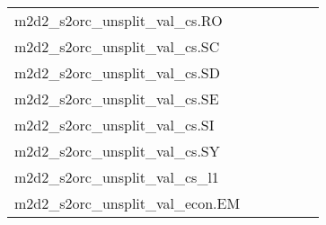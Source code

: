{\begin{longtable}{m{6cm}m{1.7cm}m{1.7cm}m{1.7cm}m{1.7cm}m{1.7cm}}
	m2d2\_s2orc\_unsplit\_val\_cs.RO  & \colorbox[HTML]{bee496}{\makebox[\mywidth][c]{13.04}} & \colorbox[HTML]{e2f3a9}{\makebox[\mywidth][c]{13.19}} & \colorbox[HTML]{ffffe5}{\makebox[\mywidth][c]{14.95}} & \colorbox[HTML]{d3eda0}{\makebox[\mywidth][c]{13.12}} & \colorbox[HTML]{77c578}{\makebox[\mywidth][c]{12.87}}\\
	m2d2\_s2orc\_unsplit\_val\_cs.SC  & \colorbox[HTML]{78c679}{\makebox[\mywidth][c]{11.10}} & \colorbox[HTML]{def2a6}{\makebox[\mywidth][c]{11.42}} & \colorbox[HTML]{ffffe5}{\makebox[\mywidth][c]{13.33}} & \colorbox[HTML]{c3e698}{\makebox[\mywidth][c]{11.30}} & \colorbox[HTML]{77c578}{\makebox[\mywidth][c]{11.10}}\\
	m2d2\_s2orc\_unsplit\_val\_cs.SD  & \colorbox[HTML]{b4e091}{\makebox[\mywidth][c]{13.27}} & \colorbox[HTML]{dcf1a5}{\makebox[\mywidth][c]{13.42}} & \colorbox[HTML]{ffffe5}{\makebox[\mywidth][c]{15.26}} & \colorbox[HTML]{d0ec9e}{\makebox[\mywidth][c]{13.36}} & \colorbox[HTML]{77c578}{\makebox[\mywidth][c]{13.13}}\\
	m2d2\_s2orc\_unsplit\_val\_cs.SE  & \colorbox[HTML]{ffffe5}{\makebox[\mywidth][c]{17.72}} & \colorbox[HTML]{addd8e}{\makebox[\mywidth][c]{13.47}} & \colorbox[HTML]{fefee0}{\makebox[\mywidth][c]{15.46}} & \colorbox[HTML]{a0d789}{\makebox[\mywidth][c]{13.40}} & \colorbox[HTML]{77c578}{\makebox[\mywidth][c]{13.21}}\\
	m2d2\_s2orc\_unsplit\_val\_cs.SI  & \colorbox[HTML]{8ecf81}{\makebox[\mywidth][c]{12.03}} & \colorbox[HTML]{d9f0a3}{\makebox[\mywidth][c]{12.25}} & \colorbox[HTML]{ffffe5}{\makebox[\mywidth][c]{14.03}} & \colorbox[HTML]{c8e89a}{\makebox[\mywidth][c]{12.19}} & \colorbox[HTML]{77c578}{\makebox[\mywidth][c]{11.99}}\\
	m2d2\_s2orc\_unsplit\_val\_cs.SY  & \colorbox[HTML]{7fc97b}{\makebox[\mywidth][c]{11.40}} & \colorbox[HTML]{ebf7b0}{\makebox[\mywidth][c]{11.79}} & \colorbox[HTML]{ffffe5}{\makebox[\mywidth][c]{13.51}} & \colorbox[HTML]{d0ec9e}{\makebox[\mywidth][c]{11.63}} & \colorbox[HTML]{77c578}{\makebox[\mywidth][c]{11.39}}\\
	m2d2\_s2orc\_unsplit\_val\_cs\_l1  & \colorbox[HTML]{77c578}{\makebox[\mywidth][c]{8.39}} & \colorbox[HTML]{e5f4ab}{\makebox[\mywidth][c]{8.68}} & \colorbox[HTML]{ffffe5}{\makebox[\mywidth][c]{10.12}} & \colorbox[HTML]{d3eda0}{\makebox[\mywidth][c]{8.59}} & \colorbox[HTML]{a9db8c}{\makebox[\mywidth][c]{8.47}}\\
	m2d2\_s2orc\_unsplit\_val\_econ.EM  & \colorbox[HTML]{c5e799}{\makebox[\mywidth][c]{11.62}} & \colorbox[HTML]{e1f3a9}{\makebox[\mywidth][c]{11.76}} & \colorbox[HTML]{ffffe5}{\makebox[\mywidth][c]{13.73}} & \colorbox[HTML]{d3eda0}{\makebox[\mywidth][c]{11.68}} & \colorbox[HTML]{77c578}{\makebox[\mywidth][c]{11.41}}\\

\end{longtable}}
